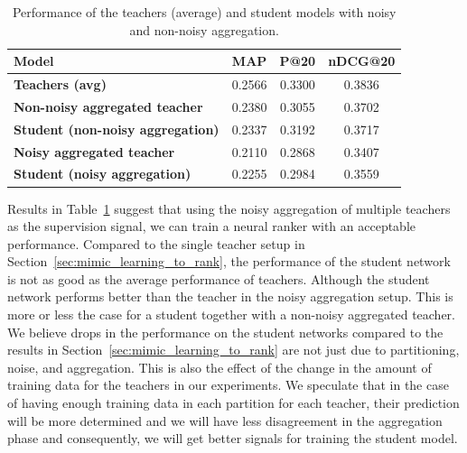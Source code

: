 \begin{table}[t]
\centering
\caption{\label{tbl_res2}Performance of the teachers (average) and student models with noisy and non-noisy aggregation.}
\vspace{5pt}
\begin{adjustbox}{max width=\textwidth}
\begin{tabular}{l c c c}
\toprule
 \textbf{Model} & \textbf{MAP} & \textbf{P@20} & \textbf{nDCG@20} 
\\ \midrule
{\textbf{Teachers (avg)}}
& 0.2566 & 0.3300 & 0.3836
\\ \midrule
\textbf{Non-noisy aggregated teacher} 
& 0.2380 & 0.3055 & 0.3702 
\\
\textbf{Student \small{(non-noisy aggregation)}} 
& 0.2337 & 0.3192 & 0.3717
\\ \midrule 
\textbf{Noisy aggregated teacher} 
& 0.2110 & 0.2868 & 0.3407 
\\
\textbf{Student \small{(noisy aggregation)}} 
& 0.2255 & 0.2984 & 0.3559 
\\ \bottomrule
\end{tabular}
\end{adjustbox}
\end{table}

Results in Table~\ref{tbl_res2} suggest that using the noisy aggregation of multiple teachers as the supervision signal, we can train a neural ranker with an acceptable performance.
%
Compared to the single teacher setup in Section~\ref{sec:mimic_learning_to_rank}, the performance of the student network is not as good as the average performance of teachers. Although the student network performs better than the teacher in the noisy aggregation setup. This is more or less the case for a student together with a non-noisy aggregated teacher.
% 
We believe drops in the performance on the student networks compared to the results in Section~\ref{sec:mimic_learning_to_rank} are not just due to partitioning, noise, and aggregation. This is also the effect of the change in the amount of training data for the teachers in our experiments. We speculate that in the case of having enough training data in each partition for each teacher, their prediction will be more determined and we will have less disagreement in the aggregation phase and consequently, we will get better signals for training the student model.


